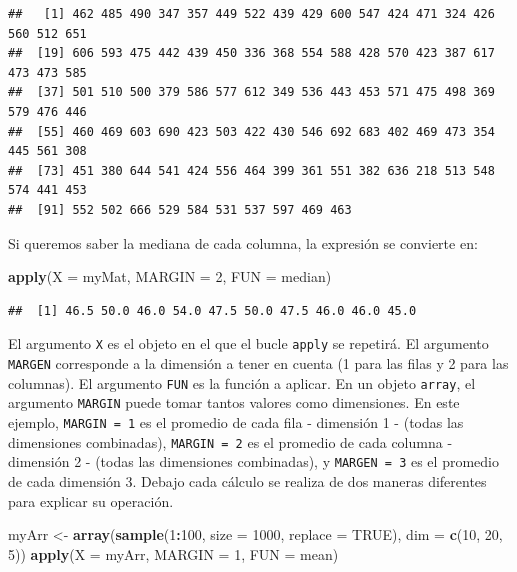 \documentclass[
]{book}
\newenvironment{Shaded}{\begin{snugshade}}{\end{snugshade}}
\newcommand{\DataTypeTok}[1]{\textcolor[rgb]{0.13,0.29,0.53}{#1}}
\newcommand{\DecValTok}[1]{\textcolor[rgb]{0.00,0.00,0.81}{#1}}
\newcommand{\KeywordTok}[1]{\textcolor[rgb]{0.13,0.29,0.53}{\textbf{#1}}}
\newcommand{\NormalTok}[1]{#1}
\newcommand{\OperatorTok}[1]{\textcolor[rgb]{0.81,0.36,0.00}{\textbf{#1}}}
\newcommand{\OtherTok}[1]{\textcolor[rgb]{0.56,0.35,0.01}{#1}}
\newcommand{\StringTok}[1]{\textcolor[rgb]{0.31,0.60,0.02}{#1}}
\begin{document}
\begin{verbatim}
##   [1] 462 485 490 347 357 449 522 439 429 600 547 424 471 324 426 560 512 651
##  [19] 606 593 475 442 439 450 336 368 554 588 428 570 423 387 617 473 473 585
##  [37] 501 510 500 379 586 577 612 349 536 443 453 571 475 498 369 579 476 446
##  [55] 460 469 603 690 423 503 422 430 546 692 683 402 469 473 354 445 561 308
##  [73] 451 380 644 541 424 556 464 399 361 551 382 636 218 513 548 574 441 453
##  [91] 552 502 666 529 584 531 537 597 469 463
\end{verbatim}

Si queremos saber la mediana de cada columna, la expresión se convierte en:

\begin{Shaded}
\begin{Highlighting}[]
\KeywordTok{apply}\NormalTok{(}\DataTypeTok{X =}\NormalTok{ myMat, }\DataTypeTok{MARGIN =} \DecValTok{2}\NormalTok{, }\DataTypeTok{FUN =}\NormalTok{ median)}
\end{Highlighting}
\end{Shaded}

\begin{verbatim}
##  [1] 46.5 50.0 46.0 54.0 47.5 50.0 47.5 46.0 46.0 45.0
\end{verbatim}

El argumento \texttt{X} es el objeto en el que el bucle \texttt{apply} se repetirá. El argumento \texttt{MARGEN} corresponde a la dimensión a tener en cuenta (1 para las filas y 2 para las columnas). El argumento \texttt{FUN} es la función a aplicar. En un objeto \texttt{array}, el argumento \texttt{MARGIN} puede tomar tantos valores como dimensiones. En este ejemplo, \texttt{MARGIN\ =\ 1} es el promedio de cada fila - dimensión 1 - (todas las dimensiones combinadas), \texttt{MARGIN\ =\ 2} es el promedio de cada columna - dimensión 2 - (todas las dimensiones combinadas), y \texttt{MARGEN\ =\ 3} es el promedio de cada dimensión 3. Debajo cada cálculo se realiza de dos maneras diferentes para explicar su operación.

\begin{Shaded}
\begin{Highlighting}[]
\NormalTok{myArr <-}\StringTok{ }\KeywordTok{array}\NormalTok{(}\KeywordTok{sample}\NormalTok{(}\DecValTok{1}\OperatorTok{:}\DecValTok{100}\NormalTok{, }\DataTypeTok{size =} \DecValTok{1000}\NormalTok{, }\DataTypeTok{replace =} \OtherTok{TRUE}\NormalTok{), }\DataTypeTok{dim =} \KeywordTok{c}\NormalTok{(}\DecValTok{10}\NormalTok{, }\DecValTok{20}\NormalTok{, }\DecValTok{5}\NormalTok{))}
\KeywordTok{apply}\NormalTok{(}\DataTypeTok{X =}\NormalTok{ myArr, }\DataTypeTok{MARGIN =} \DecValTok{1}\NormalTok{, }\DataTypeTok{FUN =}\NormalTok{ mean)}
\end{Highlighting}
\end{Shaded}
\end{document}
